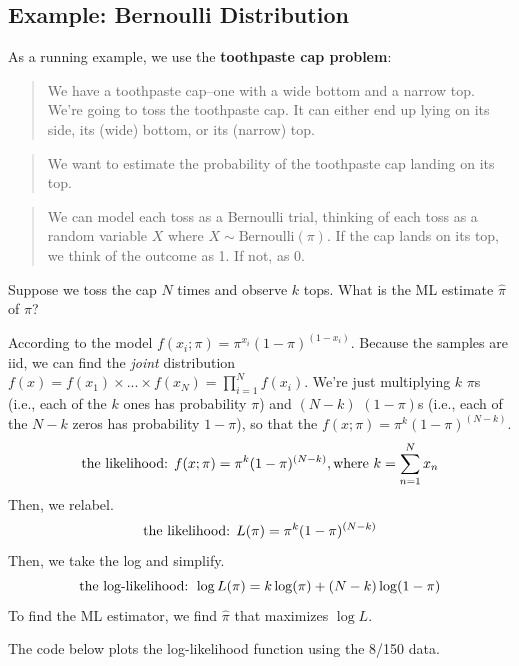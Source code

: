 \documentclass[
]{book}
\begin{document}
\hypertarget{example-bernoulli-distribution}{%
\subsection{Example: Bernoulli Distribution}\label{example-bernoulli-distribution}}

As a running example, we use the \textbf{toothpaste cap problem}:

\begin{quote}
We have a toothpaste cap--one with a wide bottom and a narrow top. We're going to toss the toothpaste cap. It can either end up lying on its side, its (wide) bottom, or its (narrow) top.
\end{quote}

\begin{quote}
We want to estimate the probability of the toothpaste cap landing on its top.
\end{quote}

\begin{quote}
We can model each toss as a Bernoulli trial, thinking of each toss as a random variable \(X\) where \(X \sim \text{Bernoulli}(\pi)\). If the cap lands on its top, we think of the outcome as 1. If not, as 0.
\end{quote}

Suppose we toss the cap \(N\) times and observe \(k\) tops. What is the ML estimate \(\hat{\pi}\) of \(\pi\)?

According to the model \(f(x_i; \pi) = \pi^{x_i} (1 - \pi)^{(1 - x_i)}\). Because the samples are iid, we can find the \emph{joint} distribution \(f(x) = f(x_1) \times ... \times f(x_N) = \prod_{i = 1}^N f(x_i)\). We're just multiplying \(k\) \(\pi\)s (i.e., each of the \(k\) ones has probability \(\pi\)) and \((N - k)\) \((1 - \pi)\)s (i.e., each of the \(N - k\) zeros has probability \(1 - \pi\)), so that the \(f(x; \pi) = \pi^{k} (1 - \pi)^{(N - k)}\).
\[
\text{the likelihood:  } f(x; \pi) =  \pi^{k} (1 - \pi)^{(N - k)}, \text{where } k = \sum_{n = 1}^N x_n \\
\]
Then, we relabel.
\[
\text{the likelihood:  } L(\pi) = \pi^{k} (1 - \pi)^{(N - k)}\\
\]
Then, we take the log and simplify.
\[
\text{the log-likelihood:  } \log L(\pi) = k \log (\pi) + (N - k) \log(1 - \pi)\\
\]
To find the ML estimator, we find \(\hat{\pi}\) that maximizes \(\log L\).

The code below plots the log-likelihood function using the 8/150 data.
\end{document}
